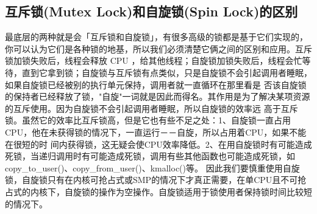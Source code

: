 \documentclass[../../../interview-questions.tex]{subfiles}
\begin{document}
\subsection{互斥锁(Mutex Lock)和自旋锁(Spin Lock)的区别}

最底层的两种就是会「互斥锁和自旋锁」，有很多高级的锁都是基于它们实现的，你可以认为它们是各种锁的地基，所以我们必须清楚它俩之间的区别和应用。互斥锁加锁失败后，线程会释放 CPU ，给其他线程；自旋锁加锁失败后，线程会忙等待，直到它拿到锁；自旋锁与互斥锁有点类似，只是自旋锁不会引起调用者睡眠，如果自旋锁已经被别的执行单元保持，调用者就一直循环在那里看是 否该自旋锁的保持者已经释放了锁，"自旋"一词就是因此而得名。其作用是为了解决某项资源的互斥使用。因为自旋锁不会引起调用者睡眠，所以自旋锁的效率远 高于互斥锁。虽然它的效率比互斥锁高，但是它也有些不足之处：1、自旋锁一直占用CPU，他在未获得锁的情况下，一直运行－－自旋，所以占用着CPU，如果不能在很短的时 间内获得锁，这无疑会使CPU效率降低。2、在用自旋锁时有可能造成死锁，当递归调用时有可能造成死锁，调用有些其他函数也可能造成死锁，如 copy\_to\_user()、copy\_from\_user()、kmalloc()等。
因此我们要慎重使用自旋锁，自旋锁只有在内核可抢占式或SMP的情况下才真正需要，在单CPU且不可抢占式的内核下，自旋锁的操作为空操作。自旋锁适用于锁使用者保持锁时间比较短的情况下。
\end{document}
